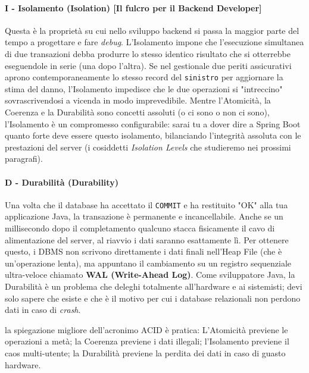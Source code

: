 \paragraph{I - Isolamento (Isolation) [Il fulcro per il Backend Developer]}
Questa è la proprietà su cui nello sviluppo backend si passa la maggior parte del tempo a progettare e fare \textit{debug}. L'Isolamento impone che l'esecuzione simultanea di due transazioni debba produrre lo stesso identico risultato che si otterrebbe eseguendole in serie (una dopo l'altra).
Se nel gestionale due periti assicurativi aprono contemporaneamente lo stesso record del \texttt{sinistro} per aggiornare la stima del danno, l'Isolamento impedisce che le due operazioni si "intreccino" sovrascrivendosi a vicenda in modo imprevedibile. 
Mentre l'Atomicità, la Coerenza e la Durabilità sono concetti assoluti (o ci sono o non ci sono), l'Isolamento è un compromesso configurabile: sarai tu a dover dire a Spring Boot quanto forte deve essere questo isolamento, bilanciando l'integrità assoluta con le prestazioni del server (i cosiddetti \textit{Isolation Levels} che studieremo nei prossimi paragrafi).

\paragraph{D - Durabilità (Durability)}
Una volta che il database ha accettato il \texttt{COMMIT} e ha restituito "OK" alla tua applicazione Java, la transazione è permanente e incancellabile. Anche se un millisecondo dopo il completamento qualcuno stacca fisicamente il cavo di alimentazione del server, al riavvio i dati saranno esattamente lì.
Per ottenere questo, i DBMS non scrivono direttamente i dati finali nell'Heap File (che è un'operazione lenta), ma appuntano il cambiamento su un registro sequenziale ultra-veloce chiamato \textbf{WAL (Write-Ahead Log)}. 
Come sviluppatore Java, la Durabilità è un problema che deleghi totalmente all'hardware e ai sistemisti; devi solo sapere che esiste e che è il motivo per cui i database relazionali non perdono dati in caso di \textit{crash}.

\begin{tip}[Riepilogo A.C.I.D.]
    la spiegazione migliore dell'acronimo ACID è pratica:
    L'Atomicità previene le operazioni a metà; la Coerenza previene i dati illegali; l'Isolamento previene il caos multi-utente; la Durabilità previene la perdita dei dati in caso di guasto hardware.
\end{tip}

